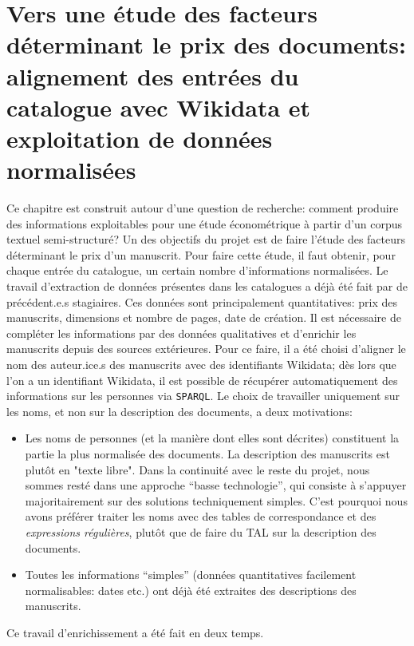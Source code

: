 \documentclass[a4paper, 12pt, twoside]{book}
\newcommand{\rgx}{\textit{expressions régulières}}
\newcommand{\sparql}{\texttt{SPARQL}}
\begin{document}
\chapter{Vers une étude des facteurs déterminant le prix des documents: alignement des entrées du catalogue avec Wikidata et exploitation de données normalisées}
Ce chapitre est construit autour d'une question de recherche: comment produire des informations exploitables pour une étude économétrique à partir d'un corpus textuel semi-structuré? Un des objectifs du projet est de faire l'étude des facteurs déterminant le prix d'un manuscrit. Pour faire cette étude, il faut obtenir, pour chaque entrée du catalogue, un certain nombre d'informations normalisées. Le travail d'extraction de données présentes dans les catalogues a déjà été fait par de précédent.e.s stagiaires. Ces données sont principalement quantitatives: prix des manuscrits, dimensions et nombre de pages, date de création. Il est nécessaire de compléter les informations par des données qualitatives et d'enrichir les manuscrits depuis des sources extérieures. Pour ce faire, il a été choisi d'aligner le nom des auteur.ice.s des manuscrits avec des identifiants Wikidata; dès lors que l'on a un identifiant Wikidata, il est possible de récupérer automatiquement des informations sur les personnes via \sparql. Le choix de travailler uniquement sur les noms, et non sur la description des documents, a deux motivations:
\begin{itemize}
	\item Les noms de personnes (et la manière dont elles sont décrites) constituent la partie la plus normalisée des documents. La description des manuscrits est plutôt en "texte libre". Dans la continuité avec le reste du projet, nous sommes resté dans une approche \enquote{basse technologie}, qui consiste à s'appuyer majoritairement sur des solutions techniquement simples. C'est pourquoi nous avons préférer traiter les noms avec des tables de correspondance et des \rgx{}, plutôt que de faire du TAL sur la description des documents.
	\item Toutes les informations \enquote{simples} (données quantitatives facilement normalisables: dates etc.) ont déjà été extraites des descriptions des manuscrits.
\end{itemize}

Ce travail d'enrichissement a été fait en deux temps. 
\end{document}
